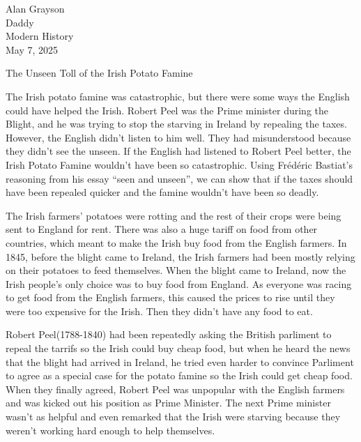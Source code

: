 \documentclass[12pt]{article}
\begin{document}
\begin{flushleft}

Alan Grayson\\
Daddy\\
Modern History\\
May 7, 2025\\


\begin{center}
The Unseen Toll of the Irish Potato Famine
\end{center}

\setlength{\parindent}{0.5in}

The Irish potato famine was catastrophic, but there were some ways the
English could have helped the Irish.  Robert Peel was the Prime
minister during the Blight, and he was trying to stop the starving in
Ireland by repealing the taxes. However, the English didn't listen to
him well. They had misunderstood because they didn't see the
unseen. If the English had listened to Robert Peel better, the Irish
Potato Famine wouldn't have been so catastrophic. Using Frédéric
Bastiat's reasoning from his essay ``seen and unseen'', we can show
that if the taxes should have been repealed quicker and the famine
wouldn't have been so deadly.


The Irish farmers' potatoes were rotting and the rest of their crops
were being sent to England for rent. There was also a huge tariff on
food from other countries, which meant to make the Irish buy food from
the English farmers. In 1845, before the blight came to Ireland, the
Irish farmers had been mostly relying on their potatoes to feed
themselves. When the blight came to Ireland, now the Irish people's
only choice was to buy food from England. As everyone was racing to
get food from the English farmers, this caused the prices to rise until
they were too expensive for the Irish. Then they didn't have
any food to eat.



Robert Peel(1788-1840) had been repeatedly asking the British
parliment to repeal the tarrifs so the Irish could buy cheap food, but
when he heard the news that the blight had arrived in Ireland, he
tried even harder to convince Parliment to agree as a special case for
the potato famine so the Irish could get cheap food. When they finally
agreed, Robert Peel was unpopular with the English farmers and was
kicked out his position as Prime Minister. The next Prime minister
wasn't as helpful and even remarked that the Irish were starving
because they weren't working hard enough to help themselves.




\end{flushleft}
\end{document}
